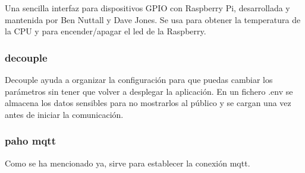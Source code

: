 Una sencilla interfaz para dispositivos GPIO con Raspberry Pi, desarrollada y mantenida por Ben Nuttall y Dave Jones. Se usa para obtener la temperatura de la CPU y para encender/apagar el led de la Raspberry. \cite{gpiozero}

\subsubsection{decouple}

Decouple ayuda a organizar la configuración para que puedas cambiar los parámetros sin tener que volver a desplegar la aplicación. En un fichero .env se almacena los datos sensibles para no mostrarlos al público y se cargan una vez antes de iniciar la comunicación. \cite{decouple}

\subsubsection{paho mqtt}

Como se ha mencionado ya, sirve para establecer la conexión mqtt. \cite{paho-mqtt}